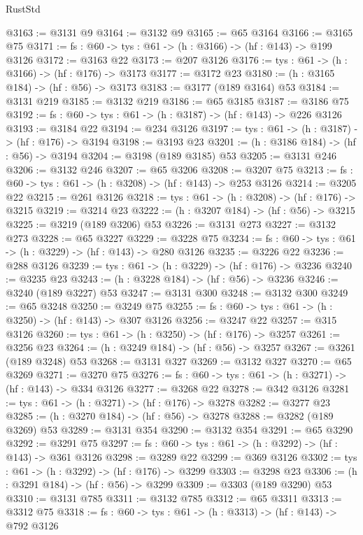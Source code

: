 \begin{lexlean}{RustStd}
\begin{coremodule}
{\begin{coremodule}
{{{{{{{{{{{{@3163 := @3131 @9
@3164 := @3132 @9
@3165 := @65 @3164
@3166 := @3165 @75
@3171 := {fs : @60} -> {tys : @61} -> (h : @3166) -> (hf : @143) -> @199 @3126
@3172 := @3163 @22
@3173 := @207 @3126
@3176 := {tys : @61} -> (h : @3166) -> (hf : @176) -> @3173
@3177 := @3172 @23
@3180 := (h : @3165 @184) -> (hf : @56) -> @3173
@3183 := @3177 (@189 @3164) @53
@3184 := @3131 @219
@3185 := @3132 @219
@3186 := @65 @3185
@3187 := @3186 @75
@3192 := {fs : @60} -> {tys : @61} -> (h : @3187) -> (hf : @143) -> @226 @3126
@3193 := @3184 @22
@3194 := @234 @3126
@3197 := {tys : @61} -> (h : @3187) -> (hf : @176) -> @3194
@3198 := @3193 @23
@3201 := (h : @3186 @184) -> (hf : @56) -> @3194
@3204 := @3198 (@189 @3185) @53
@3205 := @3131 @246
@3206 := @3132 @246
@3207 := @65 @3206
@3208 := @3207 @75
@3213 := {fs : @60} -> {tys : @61} -> (h : @3208) -> (hf : @143) -> @253 @3126
@3214 := @3205 @22
@3215 := @261 @3126
@3218 := {tys : @61} -> (h : @3208) -> (hf : @176) -> @3215
@3219 := @3214 @23
@3222 := (h : @3207 @184) -> (hf : @56) -> @3215
@3225 := @3219 (@189 @3206) @53
@3226 := @3131 @273
@3227 := @3132 @273
@3228 := @65 @3227
@3229 := @3228 @75
@3234 := {fs : @60} -> {tys : @61} -> (h : @3229) -> (hf : @143) -> @280 @3126
@3235 := @3226 @22
@3236 := @288 @3126
@3239 := {tys : @61} -> (h : @3229) -> (hf : @176) -> @3236
@3240 := @3235 @23
@3243 := (h : @3228 @184) -> (hf : @56) -> @3236
@3246 := @3240 (@189 @3227) @53
@3247 := @3131 @300
@3248 := @3132 @300
@3249 := @65 @3248
@3250 := @3249 @75
@3255 := {fs : @60} -> {tys : @61} -> (h : @3250) -> (hf : @143) -> @307 @3126
@3256 := @3247 @22
@3257 := @315 @3126
@3260 := {tys : @61} -> (h : @3250) -> (hf : @176) -> @3257
@3261 := @3256 @23
@3264 := (h : @3249 @184) -> (hf : @56) -> @3257
@3267 := @3261 (@189 @3248) @53
@3268 := @3131 @327
@3269 := @3132 @327
@3270 := @65 @3269
@3271 := @3270 @75
@3276 := {fs : @60} -> {tys : @61} -> (h : @3271) -> (hf : @143) -> @334 @3126
@3277 := @3268 @22
@3278 := @342 @3126
@3281 := {tys : @61} -> (h : @3271) -> (hf : @176) -> @3278
@3282 := @3277 @23
@3285 := (h : @3270 @184) -> (hf : @56) -> @3278
@3288 := @3282 (@189 @3269) @53
@3289 := @3131 @354
@3290 := @3132 @354
@3291 := @65 @3290
@3292 := @3291 @75
@3297 := {fs : @60} -> {tys : @61} -> (h : @3292) -> (hf : @143) -> @361 @3126
@3298 := @3289 @22
@3299 := @369 @3126
@3302 := {tys : @61} -> (h : @3292) -> (hf : @176) -> @3299
@3303 := @3298 @23
@3306 := (h : @3291 @184) -> (hf : @56) -> @3299
@3309 := @3303 (@189 @3290) @53
@3310 := @3131 @785
@3311 := @3132 @785
@3312 := @65 @3311
@3313 := @3312 @75
@3318 := {fs : @60} -> {tys : @61} -> (h : @3313) -> (hf : @143) -> @792 @3126
}}}}}}}}}}}}
\end{coremodule}}
\end{coremodule}
\end{lexlean}
